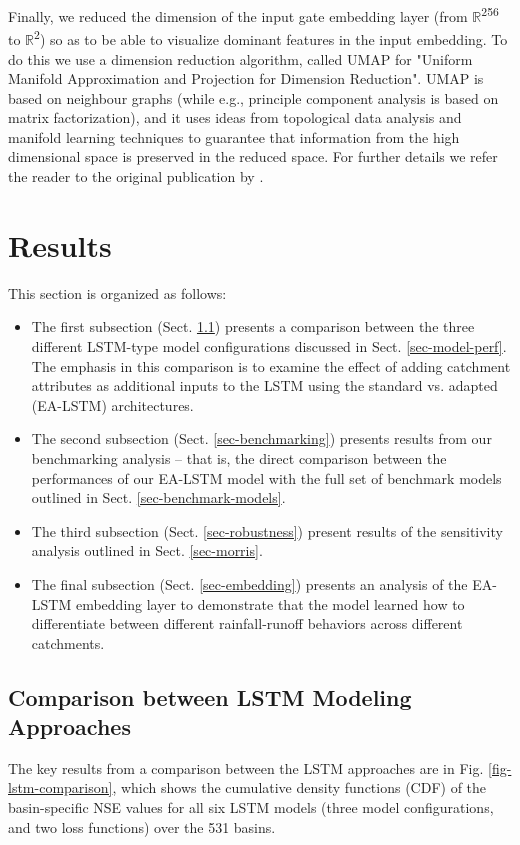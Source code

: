 Finally, we reduced the dimension of the input gate embedding layer (from $\mathbb{R}$\textsuperscript{256} to $\mathbb{R}$\textsuperscript{2}) so as to be able to visualize dominant features in the input embedding. To do this we use a dimension reduction algorithm, called UMAP \citep{mcinnes2018umap} for "Uniform Manifold Approximation and Projection for Dimension Reduction". UMAP is based on neighbour graphs (while e.g., principle component analysis is based on matrix factorization), and it uses ideas from topological data analysis and manifold learning techniques to guarantee that information from the high dimensional space is preserved in the reduced space. For further details we refer the reader to the original publication by \citet{mcinnes2018umap}.

\section{Results}\label{sec-results}
This section is organized as follows:

\begin{itemize}
  \item The first subsection (Sect. \ref{sec-results-lstm}) presents a comparison between the three different \gls{LSTM}-type model configurations discussed in Sect. \ref{sec-model-perf}. 
  The emphasis in this comparison is to examine the effect of adding catchment attributes as additional inputs to the \gls{LSTM} using the standard vs. adapted (\gls{EA-LSTM}) architectures.
  \item The second subsection (Sect. \ref{sec-benchmarking}) presents results from our benchmarking analysis – that is, the direct comparison between the performances of our \gls{EA-LSTM} model with the full set of benchmark models outlined in Sect. \ref{sec-benchmark-models}.
  \item The third subsection (Sect. \ref{sec-robustness}) present results of the sensitivity analysis outlined in Sect. \ref{sec-morris}.
  \item The final subsection (Sect. \ref{sec-embedding}) presents an analysis of the \gls{EA-LSTM} embedding layer to demonstrate that the model learned how to differentiate between different rainfall-runoff behaviors across different catchments.
\end{itemize}

\subsection{Comparison between LSTM Modeling Approaches}\label{sec-results-lstm}
The key results from a comparison between the \gls{LSTM} approaches are in Fig. \ref{fig-lstm-comparison}, which shows the cumulative density functions (CDF) of the basin-specific \gls{NSE} values for all six \gls{LSTM} models (three model configurations, and two loss functions) over the 531 basins. 


